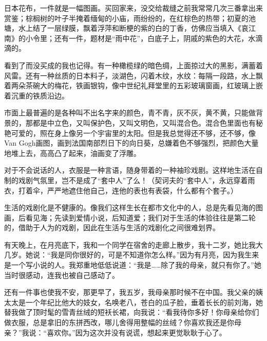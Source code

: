 \par 日本花布，一件就是一幅图画。买回家来，没交给裁缝之前我常常几次三番拿出来赏鉴；棕榈树的叶子半掩着缅甸的小庙，雨纷纷的，在红棕色的热带；初夏的池塘，水上结了一层绿膜，飘着浮萍和断梗的紫的白的丁香，仿佛应当填入《哀江南》的小令里；还有一件，题材是“雨中花”，白底子上，阴戚的紫色的大花，水滴滴的。
\par 看到了而没买成的我也记得。有一种橄榄绿的暗色绸，上面掠过大的黑影，满蓄着风雷。还有一种丝质的日本料子，淡湖色，闪着木纹，水纹：每隔一段路，水上飘着两朵茶碗大的梅花，铁画银钩，像中世纪礼拜堂里的五彩玻璃窗画，红玻璃上嵌着沉重的铁质沿边。
\par 市面上最普遍的是各种叫不出名字来的颜色，青不青，灰不灰，黄不黄，只能做背景的，那都是中立色，又叫保护色，又叫文明色，又叫混合色。混合色里面也有秘艳可爱的，照在身上像另一个宇宙里的太阳。但是我总觉得还不够，还不够，像Van Gogh画图，画到法国南部烈日下的向日葵，总嫌着色不够强烈，把颜色大量地堆上去，高高凸了起来，油画变了浮雕。
\par 对于不会说话的人，衣服是一种言语，随身带着的一种袖珍戏剧。这样地生活在自制的戏剧气氛里，岂不是成了“套中人”了么！（契诃夫的“套中人”，永远穿着雨衣，打着伞，严严地遮住他自己，连他的表也有表袋，什么都有个套子。）
\par 生活的戏剧化是不健康的。像我们这样生长在都市文化中的人，总是先看见海的图画，后看见海；先读到爱情小说，后知道爱；我们对于生活的体验往往是第二轮的，借助于人为的戏剧，因此在生活与生活的戏剧化之间很难划界。
\par 有天晚上，在月亮底下，我和一个同学在宿舍的走廊上散步，我十二岁，她比我大几岁。她说：“我是同你很好的，可是不知道你怎么样。”因为有月亮，因为我生来是一个写小说的人。我郑重地低低说道：“我是……除了我的母亲，就只有你了。”她当时很感动，连我也被自己感动了。
\par 还有一件事也使我不安，那更早了，我五岁，我母亲那时候不在中国。我父亲的姨太太是一个年纪比他大的妓女，名唤老八，苍白的瓜子脸，垂着长长的前刘海，她替我做了顶时髦的雪青丝绒的短袄长裙，向我说：“看我待你多好！你母亲给你们做衣服，总是拿旧的东拼西改，哪儿舍得用整幅的丝绒？你喜欢我还是你母亲？”我说：“喜欢你。”因为这次并没有说谎，想起来更觉耿耿于心了。
